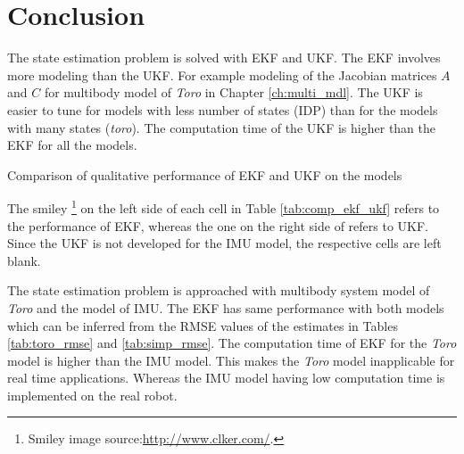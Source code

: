 \chapter{Conclusion}
\label{ch:conclusion}

 The state estimation problem is solved with EKF and UKF. The EKF involves more modeling than the UKF. For example modeling of the Jacobian matrices $A$ and $C$ for multibody model of \emph{Toro} in Chapter \ref{ch:multi_mdl}. The UKF is easier to tune for models with less number of states (IDP) than for the models with many states (\emph{toro}). The computation time of the UKF is higher than the EKF for all the models. 
 \begin{table}[H]
	\centering
	
	\caption{Comparison of qualitative performance of EKF and UKF on the models}
	\label{tab:comp_ekf_ukf}
\end{table}

The smiley \footnote{Smiley image source:\url{http://www.clker.com/}.} on the left side of each cell in Table \ref{tab:comp_ekf_ukf} refers to the performance of EKF, whereas the one on the right side of refers to UKF. Since the UKF is not developed for the IMU model, the respective cells are left blank.

The state estimation problem is approached with multibody system model of \emph{Toro} and the model of IMU. The EKF has same performance with both models which can be inferred from the RMSE values of the estimates in Tables \ref{tab:toro_rmse} and \ref{tab:simp_rmse}. The computation time of EKF for the \emph{Toro} model is higher than the IMU model. This makes the \emph{Toro} model inapplicable for real time applications. Whereas the IMU model having low computation time is implemented on the real robot.

